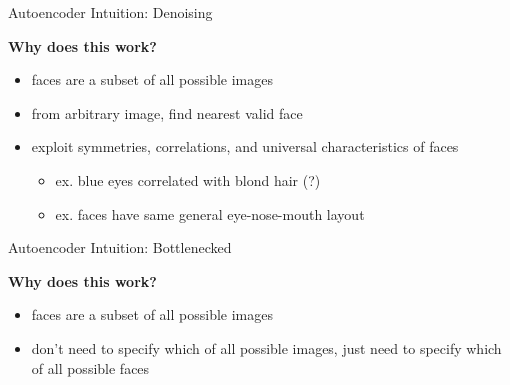 %
%
%
%
%

\begin{frame}{Autoencoder Intuition: Denoising}

\Large

\textbf{Why does this work?}

\pause

\begin{itemize}[<+->]
\item faces are a subset of all possible images
\item from arbitrary image, find nearest valid face
\item exploit symmetries, correlations, and universal characteristics of faces
\begin{itemize}[<+->]
\item ex. blue eyes correlated with blond hair (?)
\item ex. faces have same general eye-nose-mouth layout
\end{itemize}

\end{itemize}

\end{frame}


\begin{frame}{Autoencoder Intuition: Bottlenecked}

\Large

\textbf{Why does this work?}

\pause

\begin{itemize}[<+->]
\pause
\item faces are a subset of all possible images
\pause
\item don't need to specify which of all possible images, just need to specify which of all possible faces
\end{itemize}

\end{frame}


